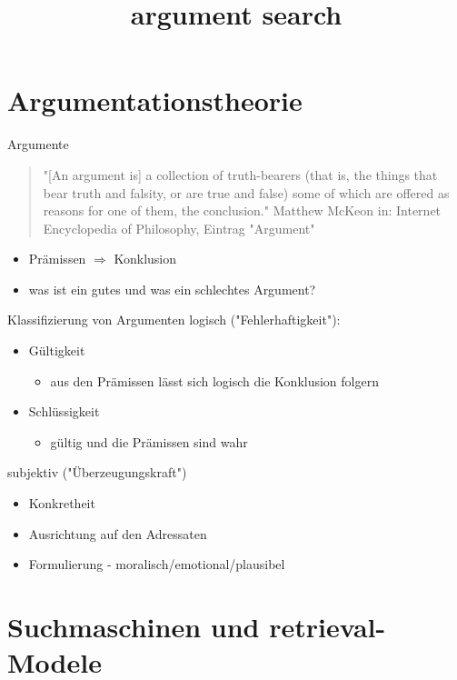 \documentclass{beamer}
\title{argument search}
\begin{document}
	\begin{frame}
		\tableofcontents
	\end{frame}

	\section{Argumentationstheorie}
	\begin{frame}{Argumente}
		\begin{quote}
			"[An argument is] a collection of truth-bearers (that is, the things that bear truth and falsity, or are true and false) some of which are offered as reasons for one of them, the conclusion."
			\flushright \tiny Matthew McKeon in: Internet Encyclopedia of Philosophy, Eintrag "Argument"
		\end{quote}
		\begin{itemize}[<+->]
			\item Prämissen $\Rightarrow$ Konklusion
			\item was ist ein gutes und was ein schlechtes Argument?
		\end{itemize}
	\end{frame}
	\begin{frame}{Klassifizierung von Argumenten}
		logisch ("Fehlerhaftigkeit"):
		\begin{itemize}[<+->]
			\item Gültigkeit
			\begin{itemize}
				\item aus den Prämissen lässt sich logisch die Konklusion folgern
			\end{itemize}
			\item Schlüssigkeit
			\begin{itemize}
				\item gültig und die Prämissen sind wahr
			\end{itemize}
		\end{itemize}
		subjektiv ("Überzeugungskraft")		\begin{itemize}[<+->]
			\item Konkretheit
			\item Ausrichtung auf den Adressaten
			\item Formulierung - moralisch/emotional/plausibel
		\end{itemize}
	\end{frame}
	\section{Suchmaschinen und retrieval-Modele}
\end{document}
